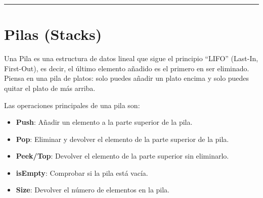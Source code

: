 \documentclass[
  spanish,
  letterpaper,
  DIV=11,
  numbers=noendperiod]{scrreprt}
\newenvironment{Shaded}{\begin{snugshade}}{\end{snugshade}}
\newcommand{\CommentTok}[1]{\textcolor[rgb]{0.37,0.37,0.37}{#1}}
\newcommand{\FunctionTok}[1]{\textcolor[rgb]{0.28,0.35,0.67}{#1}}
\newcommand{\NormalTok}[1]{\textcolor[rgb]{0.00,0.23,0.31}{#1}}
\newcommand{\SpecialCharTok}[1]{\textcolor[rgb]{0.37,0.37,0.37}{#1}}
\newcommand{\StringTok}[1]{\textcolor[rgb]{0.13,0.47,0.30}{#1}}
\providecommand{\tightlist}{%
  \setlength{\itemsep}{0pt}\setlength{\parskip}{0pt}}
\begin{document}
\begin{Shaded}
\end{Shaded}

\begin{center}\rule{0.5\linewidth}{0.5pt}\end{center}


\chapter{Pilas (Stacks)}\label{pilas-stacks}

Una Pila es una estructura de datos lineal que sigue el principio
``LIFO'' (Last-In, First-Out), es decir, el último elemento añadido es
el primero en ser eliminado. Piensa en una pila de platos: solo puedes
añadir un plato encima y solo puedes quitar el plato de más arriba.

Las operaciones principales de una pila son:

\begin{itemize}
\tightlist
\item
  \textbf{Push}: Añadir un elemento a la parte superior de la pila.
\item
  \textbf{Pop}: Eliminar y devolver el elemento de la parte superior de
  la pila.
\item
  \textbf{Peek/Top}: Devolver el elemento de la parte superior sin
  eliminarlo.
\item
  \textbf{isEmpty}: Comprobar si la pila está vacía.
\item
  \textbf{Size}: Devolver el número de elementos en la pila.
\end{itemize}
\end{document}
